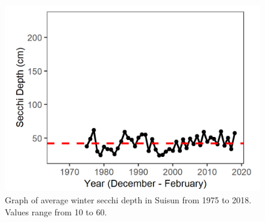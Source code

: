 \documentclass[
]{book}
\begin{document}
\begin{panel-grid}
\begin{columns-nocenter}
\begin{column800}
\begin{expand}
\end{expand}

\end{column800}

\begin{column40}

~

\end{column40}

\begin{column800}

\begin{expand}

\begin{figure}
\includegraphics[width=15.25in]{figures/secchi_sswinter} \caption{Graph of average winter secchi depth in Suisun from 1975 to 2018. Values range from 10 to 60.}\label{fig:unnamed-chunk-147}
\end{figure}

\end{expand}

\end{column800}

\begin{column40}

~

\end{column40}

\begin{column800}

\begin{expand}


\end{expand}
\end{column800}
\end{columns-nocenter}
\end{panel-grid}
\end{document}
